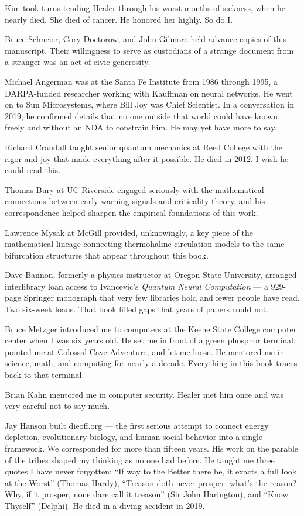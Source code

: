 Kim took turns tending Healer through his worst months of sickness, when he nearly died. She died of cancer. He honored her highly. So do I.

Bruce Schneier, Cory Doctorow, and John Gilmore held advance copies of this manuscript. Their willingness to serve as custodians of a strange document from a stranger was an act of civic generosity.

Michael Angerman was at the Santa Fe Institute from 1986 through 1995, a DARPA-funded researcher working with Kauffman on neural networks. He went on to Sun Microsystems, where Bill Joy was Chief Scientist. In a conversation in 2019, he confirmed details that no one outside that world could have known, freely and without an NDA to constrain him. He may yet have more to say.

Richard Crandall taught senior quantum mechanics at Reed College with the rigor and joy that made everything after it possible. He died in 2012. I wish he could read this.

Thomas Bury at UC Riverside engaged seriously with the mathematical connections between early warning signals and criticality theory, and his correspondence helped sharpen the empirical foundations of this work.

Lawrence Mysak at McGill provided, unknowingly, a key piece of the mathematical lineage connecting thermohaline circulation models to the same bifurcation structures that appear throughout this book.

Dave Bannon, formerly a physics instructor at Oregon State University, arranged interlibrary loan access to Ivancevic's \textit{Quantum Neural Computation} --- a 929-page Springer monograph that very few libraries hold and fewer people have read. Two six-week loans. That book filled gaps that years of papers could not.

Bruce Metzger introduced me to computers at the Keene State College computer center when I was six years old. He set me in front of a green phosphor terminal, pointed me at Colossal Cave Adventure, and let me loose. He mentored me in science, math, and computing for nearly a decade. Everything in this book traces back to that terminal.

Brian Kahn mentored me in computer security. Healer met him once and was very careful not to say much.

Jay Hanson built dieoff.org --- the first serious attempt to connect energy depletion, evolutionary biology, and human social behavior into a single framework. We corresponded for more than fifteen years. His work on the parable of the tribes shaped my thinking as no one had before. He taught me three quotes I have never forgotten: ``If way to the Better there be, it exacts a full look at the Worst'' (Thomas Hardy), ``Treason doth never prosper: what's the reason? Why, if it prosper, none dare call it treason'' (Sir John Harington), and ``Know Thyself'' (Delphi). He died in a diving accident in 2019.

